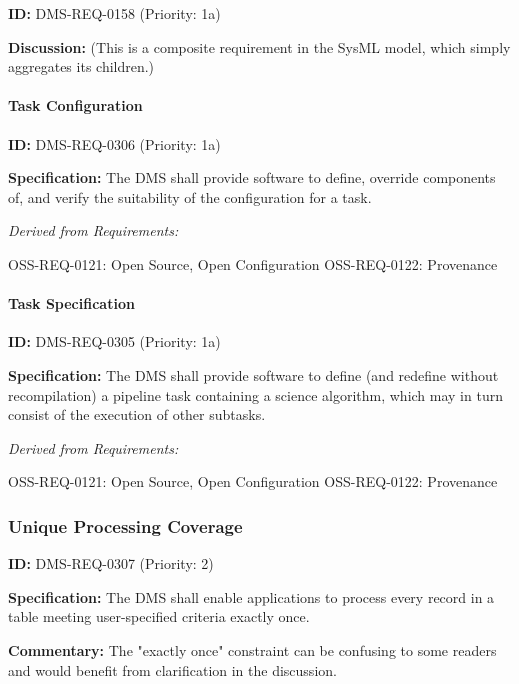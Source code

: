 \documentclass[SE,toc,lsstdraft]{lsstdoc}
\begin{document}
\label{DMS-REQ-0158}
\textbf{ID:} DMS-REQ-0158 (Priority: 1a)

\textbf{Discussion:}
(This is a composite requirement in the SysML model, which simply aggregates its children.)

\paragraph{Task Configuration}\hfill  %

\label{DMS-REQ-0306}
\textbf{ID:} DMS-REQ-0306 (Priority: 1a)

\textbf{Specification:} The DMS shall provide software to define, override components of, and verify the suitability of the configuration for a task.

\emph{Derived from Requirements:}

OSS-REQ-0121:
Open Source, Open Configuration \newline
OSS-REQ-0122:
Provenance \newline

\paragraph{Task Specification}\hfill  %

\label{DMS-REQ-0305}
\textbf{ID:} DMS-REQ-0305 (Priority: 1a)

\textbf{Specification:} The DMS shall provide software to define (and redefine without recompilation) a pipeline task containing a science algorithm, which may in turn consist of the execution of other subtasks.

\emph{Derived from Requirements:}

OSS-REQ-0121:
Open Source, Open Configuration \newline
OSS-REQ-0122:
Provenance \newline

\subsubsection{Unique Processing Coverage}

\label{DMS-REQ-0307}
\textbf{ID:} DMS-REQ-0307 (Priority: 2)

\textbf{Specification:} The DMS shall enable applications to process every record in a table meeting user-specified criteria exactly once.

\textbf{Commentary: }The "exactly once" constraint can be confusing to some readers and would benefit from clarification in the discussion.
\end{document}
